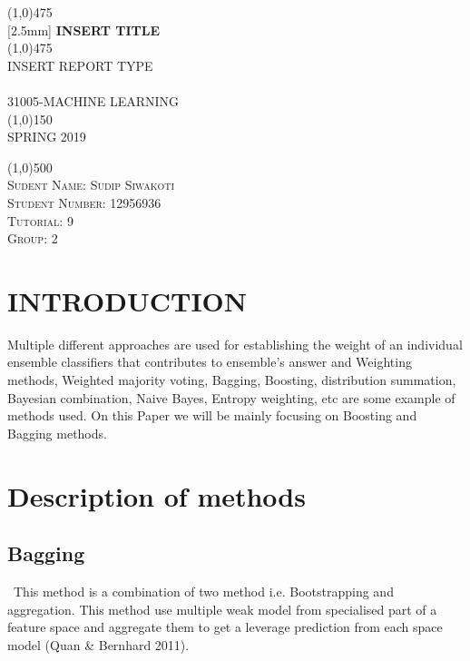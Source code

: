 \documentclass{article}
\begin{document}
\begin{titlepage}
	\begin{center}
    \line(1,0){475}\\
   [2.5mm]
    \huge{\bfseries INSERT TITLE}\\
    \line(1,0){475}\\
    [3mm]
    \textsc{\Large INSERT REPORT TYPE}\\
    [6cm]
    \textsc{\small \\
    [1mm]
    31005-MACHINE LEARNING\\
    \line(1,0){150}\\
    SPRING 2019}\\
    [6.cm]
    \end{center}
    \begin{flushleft}
    \line(1,0){500}\\
    \textsc{\large Sudent Name: Sudip Siwakoti \\Student Number: 12956936\\ Tutorial: 9 \\ Group: 2 }
    \end{flushleft}
    \lipsum[0]
\end{titlepage}
\tableofcontents
\thispagestyle{empty}
\cleardoublepage
\setcounter{page}{1}

\section{INTRODUCTION}\label{sec:intor}


Multiple different approaches are used for establishing the weight of an individual ensemble classifiers that contributes to ensemble’s answer and Weighting methods, Weighted majority voting, Bagging, Boosting, distribution summation, Bayesian combination, Naive Bayes, Entropy weighting, etc are some example of methods used. On this Paper we will be mainly focusing on Boosting and Bagging methods.
\section{Description of methods}
\subsection{Bagging}\
This method is a combination of two method i.e. Bootstrapping and aggregation. This method use multiple weak model from specialised part of a feature space and aggregate them to get a leverage prediction from each space model (Quan & Bernhard 2011).
\end{document}

